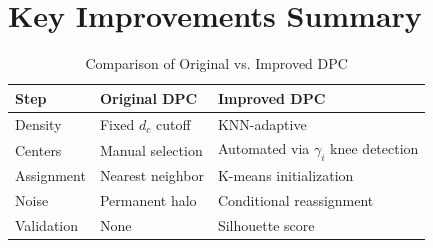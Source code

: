 \documentclass{article}
\begin{document}
\section{Key Improvements Summary}
\begin{table}[h]
    \centering
    \caption{Comparison of Original vs. Improved DPC}
    \begin{tabular}{lll}
        \toprule
        \textbf{Step} & \textbf{Original DPC} & \textbf{Improved DPC} \\
        \midrule
        Density & Fixed \(d_c\) cutoff & KNN-adaptive \\
        Centers & Manual selection & Automated via \(\gamma_i\) knee detection \\
        Assignment & Nearest neighbor & K-means initialization \\
        Noise & Permanent halo & Conditional reassignment \\
        Validation & None & Silhouette score \\
        \bottomrule
    \end{tabular}
\end{table}
\end{document}
